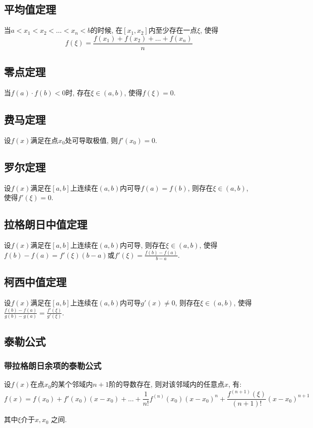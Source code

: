 \subsection{平均值定理}
当$ a<x_{1}<x_{2}<\dots<x_{n}<b $的时候, 在$ [x_{1},x_{2}] $内至少存在一点$ \xi $, 使得
\begin{equation*}
    f(\xi)=\frac{f(x_{1})+f(x_{2})+\dots+f(x_{n})}{n}
\end{equation*}
\subsection{零点定理}
当$ f(a)\cdot f(b)<0 $时, 存在$\xi\in (a,b) $, 使得$ f(\xi)=0 $.
\subsection{费马定理}
设$ f(x) $满足在点$ x_{0} $处可导取极值, 则$ f'(x_{0})=0 $.
\subsection{罗尔定理}
设$ f(x) $满足在$ [a,b] $上连续在$ (a,b) $内可导$ f(a)=f(b) $, 则存在$ \xi\in(a,b) $, 使得$ f'(\xi)=0 $.
\subsection{拉格朗日中值定理}
设$ f(x) $满足在$ [a,b] $上连续在$ (a,b) $内可导, 则存在$ \xi\in(a,b) $, 使得$ f(b)-f(a)=f'(\xi)(b-a) $或$ f'(\xi)=\frac{f(b)-f(a)}{b-a} $.
\subsection{柯西中值定理}
设$ f(x) $满足在$ [a,b] $上连续在$ (a,b) $内可导$ g'(x)\neq 0 $, 则存在$ \xi\in(a,b) $, 使得$ \frac{f(b)-f(a)}{g(b)-g(a)}=\frac{f'(\xi)}{g'(\xi)} $.
\subsection{泰勒公式}
\subsubsection{带拉格朗日余项的泰勒公式}
设$ f(x) $在点$ x_{0} $的某个邻域内$ n+1 $阶的导数存在, 则对该邻域内的任意点$ x $, 有:
\begin{equation*}
    f(x)=f(x_{0})+f'(x_{0})(x-x_{0})+\dots+\frac{1}{n!}f^{(n)}(x_{0})(x-x_{0})^{n}+\frac{f^{(n+1)}(\xi)}{(n+1)!}(x-x_{0})^{n+1}
\end{equation*}\par
其中$ \xi $介于$ x,x_{0} $ 之间.

